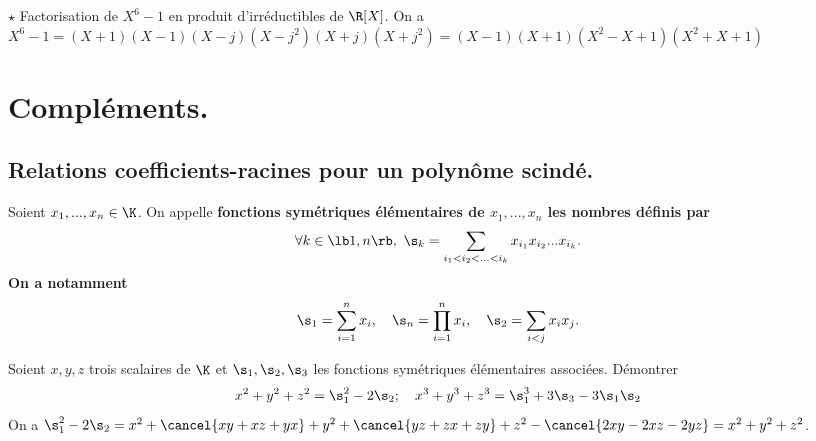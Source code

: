 \documentclass[11pt]{article}
\begin{document}
\begin{ex}{$\star$}{}
    Factorisation de $X^6-1$ en produit d'irréductibles de $\R[X]$.
    \tcblower
    On a $X^6-1 = (X+1)(X-1)(X-j)(X-j^2)(X+j)(X+j^2) = (X-1)(X+1)(X^2-X+1)(X^2+X+1)$
\end{ex}

\vspace*{-0.8cm}

\section{Compléments.}

\subsection{Relations coefficients-racines pour un polynôme scindé.}

\begin{defi}{}{}
    Soient $x_1,...,x_n\in\K$. On appelle \bf{fonctions symétriques élémentaires} de $x_1,...,x_n$ les nombres définis par
    \begin{equation*}
        \forall k \in \lb1,n\rb, ~ \s_k=\sum_{i_1<i_2<...<i_k}x_{i_1}x_{i_2}...x_{i_k}.
    \end{equation*}
    On a notamment
    \begin{equation*}
        \s_1=\sum_{i=1}^nx_i, \quad \s_n=\prod_{i=1}^n x_i, \quad \s_2=\sum_{i<j}x_ix_j.
    \end{equation*}
\end{defi}

\vspace*{-0.8cm}

\begin{ex}{}{}
    Soient $x,y,z$ trois scalaires de $\K$ et $\s_1,\s_2,\s_3$ les fonctions symétriques élémentaires associées. Démontrer
    \begin{equation*}
        x^2+y^2+z^2 = \s_1^2-2\s_2; \quad
        x^3+y^3+z^3=\s_1^3+3\s_3-3\s_1\s_2
    \end{equation*}
    \tcblower
    On a $\s_1^2-2\s_2=x^2+\cancel{xy+xz+yx}+y^2+\cancel{yz+zx+zy}+z^2-\cancel{2xy-2xz-2yz}=x^2+y^2+z^2$.
\end{ex}

\vspace*{-0.8cm}
\end{document}
